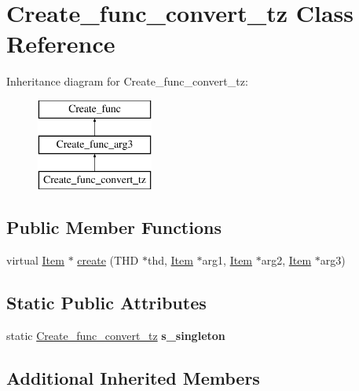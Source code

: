 \hypertarget{classCreate__func__convert__tz}{}\section{Create\+\_\+func\+\_\+convert\+\_\+tz Class Reference}
\label{classCreate__func__convert__tz}
Inheritance diagram for Create\+\_\+func\+\_\+convert\+\_\+tz\+:\begin{figure}[H]
\begin{center}
\leavevmode
\includegraphics[height=3.000000cm]{classCreate__func__convert__tz}
\end{center}
\end{figure}
\subsection*{Public Member Functions}
\begin{DoxyCompactItemize}
\item 
virtual \mbox{\hyperlink{classItem}{Item}} $\ast$ \mbox{\hyperlink{classCreate__func__convert__tz_a38294b618881eb5ba6c90d0ef58eda3d}{create}} (T\+HD $\ast$thd, \mbox{\hyperlink{classItem}{Item}} $\ast$arg1, \mbox{\hyperlink{classItem}{Item}} $\ast$arg2, \mbox{\hyperlink{classItem}{Item}} $\ast$arg3)
\end{DoxyCompactItemize}
\subsection*{Static Public Attributes}
\begin{DoxyCompactItemize}
\item 
\mbox{\label{classCreate__func__convert__tz_ac0ad433638f5bb98a7a1085a66985665}} 
static \mbox{\hyperlink{classCreate__func__convert__tz}{Create\+\_\+func\+\_\+convert\+\_\+tz}} {\bfseries s\+\_\+singleton}
\end{DoxyCompactItemize}
\subsection*{Additional Inherited Members}


